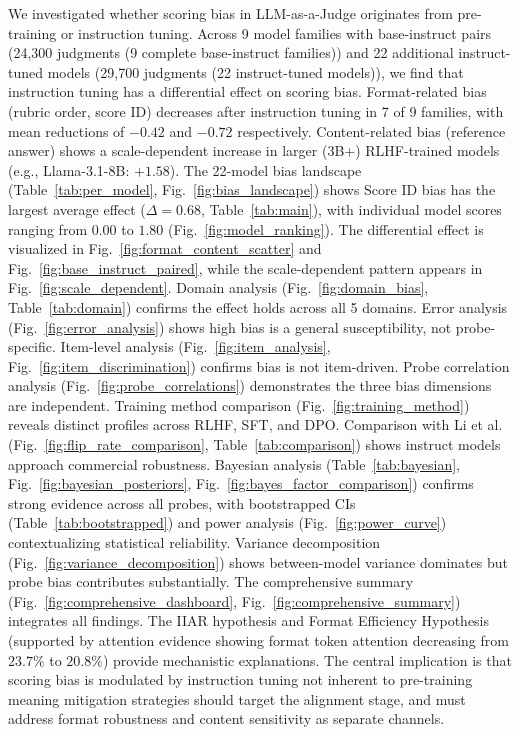 \documentclass[11pt,twocolumn]{article}
\begin{document}
We investigated whether scoring bias in LLM-as-a-Judge originates from pre-training or instruction tuning. Across 9 model families with base-instruct pairs (24,300 judgments (9 complete base-instruct families)) and 22 additional instruct-tuned models (29,700 judgments (22 instruct-tuned models)), we find that instruction tuning has a differential effect on scoring bias. Format-related bias (rubric order, score ID) decreases after instruction tuning in 7 of 9 families, with mean reductions of $-0.42$ and $-0.72$ respectively. Content-related bias (reference answer) shows a scale-dependent increase in larger (3B+) RLHF-trained models (e.g., Llama-3.1-8B: $+1.58$). The 22-model bias landscape (Table~\ref{tab:per_model}, Fig.~\ref{fig:bias_landscape}) shows Score ID bias has the largest average effect ($\Delta=0.68$, Table~\ref{tab:main}), with individual model scores ranging from $0.00$ to $1.80$ (Fig.~\ref{fig:model_ranking}). The differential effect is visualized in Fig.~\ref{fig:format_content_scatter} and Fig.~\ref{fig:base_instruct_paired}, while the scale-dependent pattern appears in Fig.~\ref{fig:scale_dependent}. Domain analysis (Fig.~\ref{fig:domain_bias}, Table~\ref{tab:domain}) confirms the effect holds across all 5 domains. Error analysis (Fig.~\ref{fig:error_analysis}) shows high bias is a general susceptibility, not probe-specific. Item-level analysis (Fig.~\ref{fig:item_analysis}, Fig.~\ref{fig:item_discrimination}) confirms bias is not item-driven. Probe correlation analysis (Fig.~\ref{fig:probe_correlations}) demonstrates the three bias dimensions are independent. Training method comparison (Fig.~\ref{fig:training_method}) reveals distinct profiles across RLHF, SFT, and DPO. Comparison with Li et al. (Fig.~\ref{fig:flip_rate_comparison}, Table~\ref{tab:comparison}) shows instruct models approach commercial robustness. Bayesian analysis (Table~\ref{tab:bayesian}, Fig.~\ref{fig:bayesian_posteriors}, Fig.~\ref{fig:bayes_factor_comparison}) confirms strong evidence across all probes, with bootstrapped CIs (Table~\ref{tab:bootstrapped}) and power analysis (Fig.~\ref{fig:power_curve}) contextualizing statistical reliability. Variance decomposition (Fig.~\ref{fig:variance_decomposition}) shows between-model variance dominates but probe bias contributes substantially. The comprehensive summary (Fig.~\ref{fig:comprehensive_dashboard}, Fig.~\ref{fig:comprehensive_summary}) integrates all findings. The IIAR hypothesis and Format Efficiency Hypothesis (supported by attention evidence showing format token attention decreasing from $23.7\%$ to $20.8\%$) provide mechanistic explanations. The central implication is that scoring bias is modulated by instruction tuning not inherent to pre-training meaning mitigation strategies should target the alignment stage, and must address format robustness and content sensitivity as separate channels.
\end{document}
